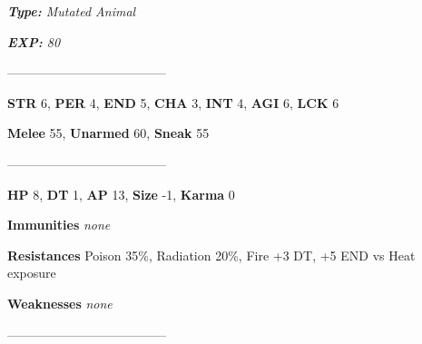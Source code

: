 \documentclass[11pt,a4paper,twocolumn]{book}
\begin{document}
	\emph{\textbf{Type:} Mutated Animal}
	
	\emph{\textbf{EXP:} 80}
	
%		
%	
%		

	--------------------------------------

	\noindent
	\textbf{STR} 6, \textbf{PER} 4, \textbf{END} 5, \textbf{CHA} 3, \textbf{INT} 4, \textbf{AGI} 6, \textbf{LCK} 6
	
	\noindent
	\textbf{Melee} 55, \textbf{Unarmed} 60, \textbf{Sneak} 55
	
	--------------------------------------
	
	\noindent
	\textbf{HP} 8, \textbf{DT} 1, \textbf{AP} 13, \textbf{Size} -1, \textbf{Karma} 0
	
	
	\noindent
	\textbf{Immunities} \emph{none} %
	
	\noindent
	\textbf{Resistances} Poison 35\%, Radiation 20\%, Fire +3 DT, +5 END vs Heat exposure %
	
	\noindent
	\textbf{Weaknesses} \emph{none} %
	
	--------------------------------------
	
\end{document}
